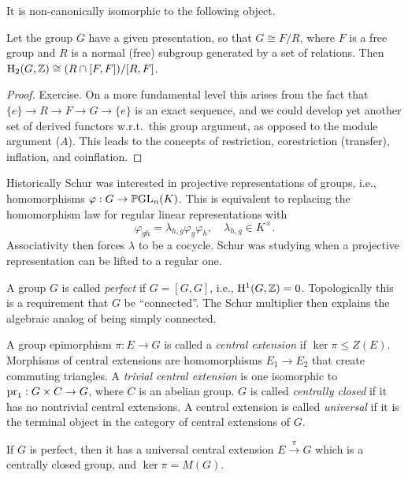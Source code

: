 It is non-canonically isomorphic to the following object.

\begin{thm}
    Let the group $G$ have a given presentation, so that $G\cong F\slash R$, where $F$ is a free group and $R$ is a normal (free) subgroup generated by a set of relations. Then $\mathrm{H}_2(G,\mathbb{Z})\cong (R\cap [F,F])\slash [R,F]$.
\end{thm}
\begin{proof}
    Exercise. On a more fundamental level this arises from the fact that $\{e\}\to R\to F\to G\to \{e\}$ is an exact sequence, and we could develop yet another set of derived functors w.r.t.\ this group argument, as opposed to the module argument ($A$). This leads to the concepts of restriction, corestriction (transfer), inflation, and coinflation.
\end{proof}

Historically Schur was interested in projective representations of groups, i.e., homomorphisms $\varphi:G\to \operatorname{\mathbb{P}GL}_n(K)$. This is equivalent to replacing the homomorphism law for regular linear representations with
\[\varphi_{gh}=\lambda_{h,g}\varphi_g\varphi_h,\quad\lambda_{h,g}\in K^\times.\]
Associativity then forces $\lambda$ to be a cocycle. Schur was studying when a projective representation can be lifted to a regular one. 

A group $G$ is called \emph{perfect} if $G=[G,G]$, i.e., $\mathrm{H}^1(G,\mathbb{Z})=0$. Topologically this is a requirement that $G$ be ``connected''. The Schur multiplier then explains the algebraic analog of being simply connected. 

\begin{defn}
    A group epimorphism $\pi:E\to G$ is called a \emph{central extension} if $\ker\pi\leq Z(E)$.  Morphisms of central extensions are homomorphisms $E_1\to E_2$ that create commuting triangles. A \emph{trivial central extension} is one isomorphic to $\operatorname{pr}_1:G\times C\to G$, where $C$ is an abelian group. $G$ is called \emph{centrally closed} if it has no nontrivial central extensions. A central extension is called \emph{universal} if it is the terminal object in the category of central extensions of $G$.
\end{defn}

\begin{thm}[Schur]
    If $G$ is perfect, then it has a universal central extension $E\overset{\pi}{\to} G$ which is a centrally closed group, and $\ker\pi =M(G)$.
\end{thm}

